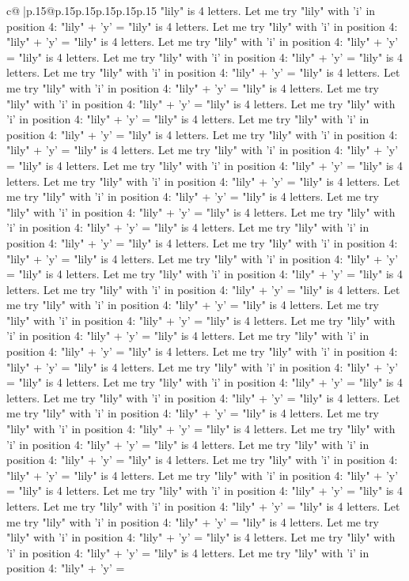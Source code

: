 \documentclass{article}
\begin{document}
{\begin{supertabular}{c@{$\;$}|p{.15\linewidth}@{}p{.15\linewidth}p{.15\linewidth}p{.15\linewidth}p{.15\linewidth}p{.15\linewidth}}
{{{"lily" is 4 letters. Let me try "lily" with 'i' in position 4: "lily" + 'y' = "lily" is 4 letters. Let me try "lily" with 'i' in position 4: "lily" + 'y' = "lily" is 4 letters. Let me try "lily" with 'i' in position 4: "lily" + 'y' = "lily" is 4 letters. Let me try "lily" with 'i' in position 4: "lily" + 'y' = "lily" is 4 letters. Let me try "lily" with 'i' in position 4: "lily" + 'y' = "lily" is 4 letters. Let me try "lily" with 'i' in position 4: "lily" + 'y' = "lily" is 4 letters. Let me try "lily" with 'i' in position 4: "lily" + 'y' = "lily" is 4 letters. Let me try "lily" with 'i' in position 4: "lily" + 'y' = "lily" is 4 letters. Let me try "lily" with 'i' in position 4: "lily" + 'y' = "lily" is 4 letters. Let me try "lily" with 'i' in position 4: "lily" + 'y' = "lily" is 4 letters. Let me try "lily" with 'i' in position 4: "lily" + 'y' = "lily" is 4 letters. Let me try "lily" with 'i' in position 4: "lily" + 'y' = "lily" is 4 letters. Let me try "lily" with 'i' in position 4: "lily" + 'y' = "lily" is 4 letters. Let me try "lily" with 'i' in position 4: "lily" + 'y' = "lily" is 4 letters. Let me try "lily" with 'i' in position 4: "lily" + 'y' = "lily" is 4 letters. Let me try "lily" with 'i' in position 4: "lily" + 'y' = "lily" is 4 letters. Let me try "lily" with 'i' in position 4: "lily" + 'y' = "lily" is 4 letters. Let me try "lily" with 'i' in position 4: "lily" + 'y' = "lily" is 4 letters. Let me try "lily" with 'i' in position 4: "lily" + 'y' = "lily" is 4 letters. Let me try "lily" with 'i' in position 4: "lily" + 'y' = "lily" is 4 letters. Let me try "lily" with 'i' in position 4: "lily" + 'y' = "lily" is 4 letters. Let me try "lily" with 'i' in position 4: "lily" + 'y' = "lily" is 4 letters. Let me try "lily" with 'i' in position 4: "lily" + 'y' = "lily" is 4 letters. Let me try "lily" with 'i' in position 4: "lily" + 'y' = "lily" is 4 letters. Let me try "lily" with 'i' in position 4: "lily" + 'y' = "lily" is 4 letters. Let me try "lily" with 'i' in position 4: "lily" + 'y' = "lily" is 4 letters. Let me try "lily" with 'i' in position 4: "lily" + 'y' = "lily" is 4 letters. Let me try "lily" with 'i' in position 4: "lily" + 'y' = "lily" is 4 letters. Let me try "lily" with 'i' in position 4: "lily" + 'y' = "lily" is 4 letters. Let me try "lily" with 'i' in position 4: "lily" + 'y' = "lily" is 4 letters. Let me try "lily" with 'i' in position 4: "lily" + 'y' = "lily" is 4 letters. Let me try "lily" with 'i' in position 4: "lily" + 'y' = "lily" is 4 letters. Let me try "lily" with 'i' in position 4: "lily" + 'y' = "lily" is 4 letters. Let me try "lily" with 'i' in position 4: "lily" + 'y' = "lily" is 4 letters. Let me try "lily" with 'i' in position 4: "lily" + 'y' = "lily" is 4 letters. Let me try "lily" with 'i' in position 4: "lily" + 'y' = "lily" is 4 letters. Let me try "lily" with 'i' in position 4: "lily" + 'y' = "lily" is 4 letters. Let me try "lily" with 'i' in position 4: "lily" + 'y' = "lily" is 4 letters. Let me try "lily" with 'i' in position 4: "lily" + 'y' = "lily" is 4 letters. Let me try "lily" with 'i' in position 4: "lily" + 'y' = "lily" is 4 letters. Let me try "lily" with 'i' in position 4: "lily" + 'y' = }}}
\end{supertabular}}
\end{document}
